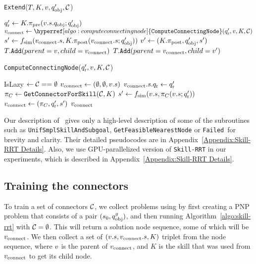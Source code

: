 \begin{algorithm}[h]
\caption{\texttt{Extend}($T, K, v, q_\text{obj}', \mathcal{C}$)}\label{algo:extend}
\begin{algorithmic}[1]
\State $q_\text{r}' \gets K.\pi_{\text{pre}}(v.s.q_\text{obj};q_\text{obj}')$
\State $\connectingnode \gets \hyperref[algo:computeconnectingnode]{\texttt{ComputeConnectingNode}}(\qrobot', \node, \skill, \connectorskillset)$
\State $s' \gets f_{\text{sim}}(v_{\text{connect}}.s, K.\pi_{\text{post}}(v_{\text{connect}}.s;q_\text{obj}'))$
\State \Return
\EndIf
\State $v' \gets (K.\pi_{\text{post}}, q_\text{obj}',s')$
\State $T.\texttt{Add}(parent=v, child=v_{\text{connect}})$
\State $T.\texttt{Add}(parent=v_{\text{connect}}, child=v')$
\end{algorithmic}
\end{algorithm}

\begin{algorithm}[h]
\caption{\texttt{ComputeConnectingNode}($q_\text{r}',v,K,\mathcal{C}$)}\label{algo:computeconnectingnode}
\begin{algorithmic}[1]
\State IsLazy $\gets \mathcal{C} == \emptyset$
\State $v_{\text{connect}} \gets (\emptyset, \emptyset, v.s)$
\State $v_{\text{connect}}.s.q_\text{r} \gets q_\text{r}'$ 
\Else
\State $\pi_C \gets \texttt{GetConnectorForSkill}(\mathcal{C},K) $
\State $s' \gets f_{\text{sim}}(v.s, \pi_C(v.s;q_\text{r}'))$
\State $v_{\text{connect}} \gets (\pi_C,q_\text{r}', s')$
\EndIf
\Return $v_{\text{connect}}$
\end{algorithmic}
\end{algorithm}

Our description of \skillrrt~gives only a high-level description of some of the subroutines such as \texttt{UnifSmplSkillAndSubgoal}, \texttt{GetFeasibleNearestNode} or \texttt{Failed}~for brevity and clarity. Their detailed pseudocodes are in Appendix~\ref{Appendix:Skill-RRT Details}. Also, we use GPU-parallelized version of \texttt{Skill-RRT} in our experiments, which is described in Appendix~\ref{Appendix:Skill-RRT Details}.

\subsection{Training the connectors}\label{method:train_connector}
To train a set of connectors $\mathcal{C}$, we collect problems using \lazyskillrrt{} by first creating a PNP problem that consists of a pair $(s_0,q_\text{obj}^g)$, and then running Algorithm~\ref{algo:skill-rrt} with $\mathcal{C}=\emptyset$. This will return a solution node sequence, some of which will be $v_{\text{connect}}$. We then collect a set of $(v.s,v_{\text{connect}}.s,K)$ triplet from the node sequence, where $v$ is the parent of $v_{\text{connect}}$, and $K$ is the skill that was used from $v_{\text{connect}}$ to get its child node.

